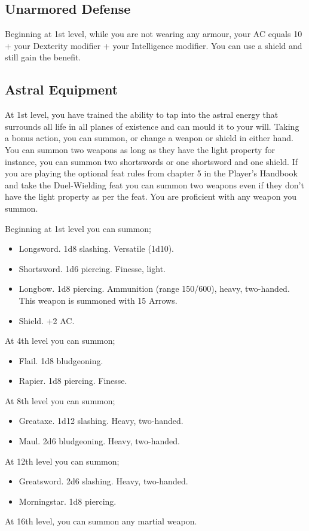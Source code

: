 \subsection{Unarmored Defense}

Beginning at 1st level, while you are not wearing any armour, your AC equals 10 + your Dexterity modifier + your Intelligence modifier. You can use a shield and still gain the benefit.

\subsection{Astral Equipment}

At 1st level, you have trained the ability to tap into the astral energy that surrounds all life in all planes of existence and can mould it to your will. Taking a bonus action, you can summon, or change a weapon or shield in either hand. You can summon two weapons as long as they have the light property for instance, you can summon two shortswords or one shortsword and one shield. If you are playing the optional feat rules from chapter 5 in the Player's Handbook and take the Duel-Wielding feat you can summon two weapons even if they don't have the light property as per the feat. You are proficient with any weapon you summon. 

Beginning at 1st level you can summon;
\begin{itemize}
\item Longsword. 1d8 slashing. Versatile (1d10).
\item Shortsword. 1d6 piercing. Finesse, light.
\item Longbow. 1d8 piercing. Ammunition (range 150/600), heavy, two-handed. This weapon is summoned with 15 Arrows.
\item Shield. +2 AC.
\end{itemize}
At 4th level you can summon;
\begin{itemize}
\item Flail. 1d8 bludgeoning.
\item Rapier. 1d8 piercing. Finesse.
\end{itemize}
At 8th level you can summon;
\begin{itemize}
\item Greataxe. 1d12 slashing. Heavy, two-handed.
\item Maul. 2d6 bludgeoning. Heavy, two-handed.
\end{itemize}
At 12th level you can summon;
\begin{itemize}
\item Greatsword. 2d6 slashing. Heavy, two-handed.
\item Morningstar. 1d8 piercing.
\end{itemize}
At 16th level, you can summon any martial weapon.

